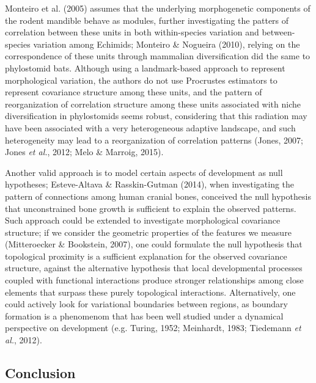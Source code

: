 \documentclass[12pt,twoside]{report}
\begin{document}
Monteiro et al. (2005) assumes that the underlying morphogenetic
components of the rodent mandible behave as modules, further
investigating the patters of correlation between these units in both
within-species variation and between-species variation among Echimids;
Monteiro \& Nogueira (2010), relying on the correspondence of these
units through mammalian diversification did the same to phylostomid
bats. Although using a landmark-based approach to represent
morphological variation, the authors do not use Procrustes estimators to
represent covariance structure among these units, and the pattern of
reorganization of correlation structure among these units associated
with niche diversification in phylostomids seems robust, considering
that this radiation may have been associated with a very heterogeneous
adaptive landscape, and such heterogeneity may lead to a reorganization
of correlation patterns (Jones, 2007; Jones \emph{et al.}, 2012; Melo \&
Marroig, 2015).

Another valid approach is to model certain aspects of development as
null hypotheses; Esteve-Altava \& Rasskin-Gutman (2014), when
investigating the pattern of connections among human cranial bones,
conceived the null hypothesis that unconstrained bone growth is
sufficient to explain the observed patterns. Such approach could be
extended to investigate morphological covariance structure; if we
consider the geometric properties of the features we measure
(Mitteroecker \& Bookstein, 2007), one could formulate the null
hypothesis that topological proximity is a sufficient explanation for
the observed covariance structure, against the alternative hypothesis
that local developmental processes coupled with functional interactions
produce stronger relationships among close elements that surpass these
purely topological interactions. Alternatively, one could actively look
for variational boundaries between regions, as boundary formation is a
phenomenom that has been well studied under a dynamical perspective on
development (e.g. Turing, 1952; Meinhardt, 1983; Tiedemann \emph{et
al.}, 2012).

\subsection{Conclusion}\label{conclusion}
\end{document}
